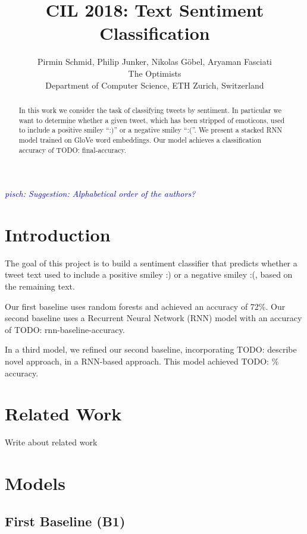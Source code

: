 \documentclass[10pt,conference,compsocconf]{IEEEtran}
\newcommand{\todo}[1]{}
\renewcommand{\todo}[1]{{\color{red} TODO: {#1}}}
\newcommand{\pisch}[1]{\textit{\textcolor{blue}{pisch: #1}}}
\begin{document}
\title{CIL 2018: Text Sentiment Classification}

\author{
  Pirmin Schmid, Philip Junker, Nikolas G\"obel, Aryaman Fasciati\\
  The Optimists\\
  Department of Computer Science, ETH Zurich, Switzerland
}

\maketitle

\pisch{Suggestion: Alphabetical order of the authors?}

\begin{abstract}
  In this work we consider the task of classifying tweets by
  sentiment. In particular we want to determine whether a given tweet,
  which has been stripped of emoticons, used to include a positive
  smiley ``:)'' or a negative smiley ``:(''. We present a stacked RNN
  model trained on GloVe word embeddings. Our model achieves a
  classification accuracy of \todo{final-accuracy}.
\end{abstract}


\section{Introduction}

The goal of this project is to build a sentiment classifier that
predicts whether a tweet text used to include a positive smiley :) or
a negative smiley :(, based on the remaining text.

Our first baseline uses random forests and achieved an accuracy of
72\%. Our second baseline uses a Recurrent Neural Network (RNN) model
with an accuracy of \todo{rnn-baseline-accuracy}.

In a third model, we refined our second baseline, incorporating
\todo{describe novel approach}, in a RNN-based approach. This model
achieved \todo{\%} accuracy.


\section{Related Work}
Write about related work \cite{go2016mastering}


\section{Models}

\subsection{First Baseline (B1)}
\end{document}
